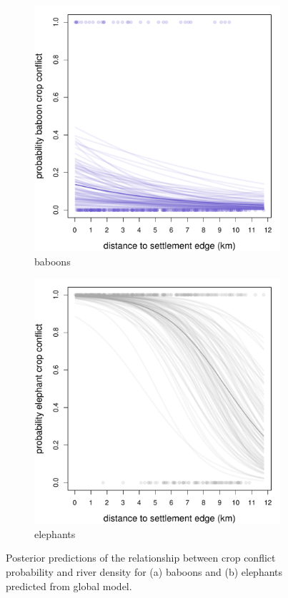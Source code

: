 \documentclass[12pt,]{article}
\begin{document}
\begin{figure}[H]
  \centering
	\begin{subfigure}[b]{0.49\textwidth}
	\includegraphics[width=\textwidth]{Figures/settle_dist_crop_global_conflict_bab.pdf} 
    \caption{baboons}
   	    \label{fig:cropSDbab}
\end{subfigure}
\begin{subfigure}[b]{0.49\textwidth}
	\includegraphics[width=\textwidth]{Figures/settle_dist_crop_global_conflict_ele.pdf}  
    \caption{elephants}
  	\label{fig:cropSDele}
\end{subfigure}
\caption{Posterior predictions of the relationship between crop conflict probability and river density for (a) baboons and (b) elephants predicted from global model.}
\end{figure}
\end{document}
